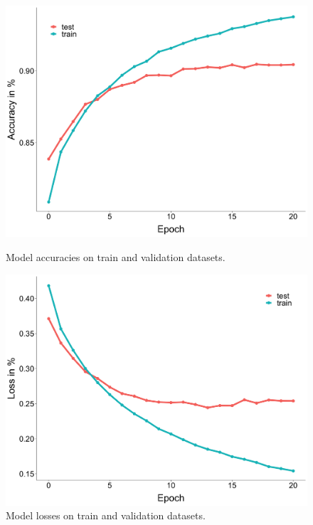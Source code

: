 \begin{figure}[htp]
    \centering
    \begin{minipage}[c]{.49\textwidth}
        \centering
        \includegraphics[width=\textwidth]{figures/plot_model_accuracies}
        \caption[Model accuracies on train and validation datasets.]{Model accuracies on train and validation datasets.}
        \label{fig:plot-model-accuracies}
    \end{minipage}
    \hfill
    \begin{minipage}[c]{.49\textwidth}
        \centering
        \includegraphics[width=\textwidth]{figures/plot_model_losses}
        \caption[Model losses on train and validation datasets.]{Model losses on train and validation datasets.}
        \label{fig:plot-model-losses}
    \end{minipage}
\end{figure}
